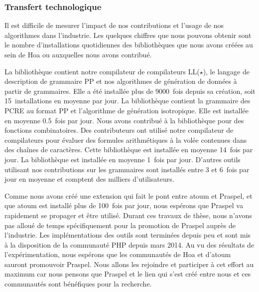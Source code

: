 \subsubsection{Transfert technologique}

Il est difficile de mesurer l'impact de nos contributions et l'usage de nos
algorithmes dans l'industrie. Les quelques chiffres que nous pouvons obtenir
sont le nombre d'installations quotidiennes des bibliothèques que nous avons
créées au sein de Hoa ou auxquelles nous avons contribué.

La bibliothèque  contient notre compilateur de
compilateurs LL($\star$), le langage de description de grammaire PP et nos
algorithmes de génération de données à partir de grammaires. Elle a été
installée plus de 9000~fois depuis sa création, soit 15~installations en moyenne
par jour. La bibliothèque  contient la grammaire des
PCRE au format PP et l'algorithme de génération isotropique. Elle est installée
en moyenne 0.5~fois par jour. Nous avons contribué à la bibliothèque
 pour des fonctions combinatoires. Des contributeurs ont
utilisé notre compilateur de compilateurs pour évaluer des formules
arithmétiques à la volée contenues dans des chaînes de caractères. Cette
bibliothèque est installée en moyenne 14~fois par jour. La bibliothèque
 est installée en moyenne 1~fois par jour.  D'autres
outils utilisant nos contributions sur les grammaires sont installés entre 3 et
6~fois par jour en moyenne et comptent des milliers d'utilisateurs. 

Comme nous avons créé une extension qui fait le pont entre atoum et Praspel, et
que atoum est installé plus de 100~fois par jour, nous espérons que Praspel va
rapidement se propager et être utilisé. Durant ces travaux de thèse, nous
n'avons pas alloué de temps spécifiquement pour la promotion de Praspel auprès
de l'industrie. Les implémentations des outils sont terminées depuis peu et sont
mis à la disposition de la communauté PHP depuis mars 2014. Au vu des résultats
de l'expérimentation, nous espérons que les communautés de Hoa et d'atoum
sauront promouvoir Praspel. Nous allons les rejoindre et participer à cet effort
au maximum car nous pensons que Praspel et le lien qui s'est créé entre nous et
ces communautés sont bénéfiques pour la recherche.
